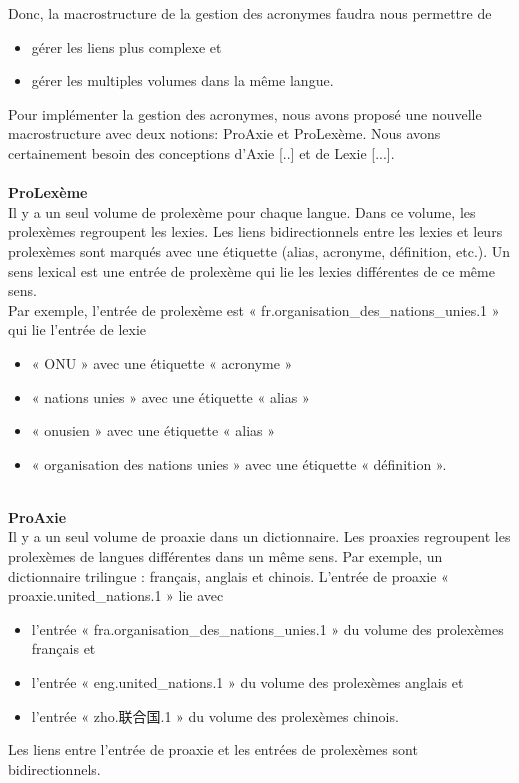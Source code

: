 \documentclass[10pt,a4paper,twoside]{article}
\newcommand{\Chinois}[1]{{\fontspec[Scale=0.9]{STSong}#1}}
\begin{document}
Donc, la macrostructure de la gestion des acronymes faudra nous permettre de 
\begin{itemize}
\item gérer les liens  plus complexe et
\item gérer les multiples volumes dans la même langue. 
\end{itemize}
Pour implémenter la gestion des acronymes, nous avons proposé une nouvelle macrostructure avec deux notions: ProAxie et ProLexème. Nous avons certainement besoin des conceptions d’Axie [..] et de Lexie [...]. \\
\\
\textbf{ProLexème}\\
Il y a un seul volume de prolexème pour chaque langue. Dans ce volume, les prolexèmes regroupent les lexies. Les liens bidirectionnels entre les lexies et leurs prolexèmes sont marqués avec une étiquette (alias, acronyme, définition, etc.). Un sens lexical est une entrée de prolexème qui lie les lexies différentes de ce même sens. \\
Par exemple, l’entrée de prolexème est « fr.organisation\_des\_nations\_unies.1 » qui lie l’entrée de lexie 
\begin{itemize}
\item « ONU » avec une étiquette « acronyme »
\item « nations unies » avec une étiquette « alias »
\item « onusien » avec une étiquette « alias »
\item « organisation des nations unies » avec une étiquette « définition ».
\end{itemize}
\quad  \\
\textbf{ProAxie}\\
Il y a un seul volume de proaxie dans un dictionnaire. Les proaxies regroupent les prolexèmes de langues différentes dans un même sens. Par exemple, un dictionnaire trilingue : français, anglais et chinois. L’entrée de proaxie « proaxie.united\_nations.1 » lie avec 
\begin{itemize}
\item l’entrée « fra.organisation\_des\_nations\_unies.1 » du volume des prolexèmes français et 
\item l’entrée « eng.united\_nations.1 » du volume des prolexèmes anglais et
\item l’entrée « zho.\Chinois{联合国}.1 » du volume des prolexèmes chinois.
\end{itemize}
Les liens entre l'entrée de proaxie et les entrées de prolexèmes sont bidirectionnels.\\
\end{document}
